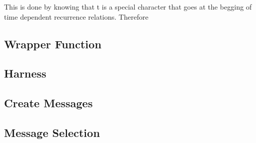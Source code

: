 \documentclass{article}
\begin{document}

This is done by knowing that t is a special character that goes at the begging of time dependent recurrence relations. Therefore %


\subsection{Wrapper Function}



\subsection{Harness}

\subsection{Create Messages}


\subsection{Message Selection}
\end{document}
